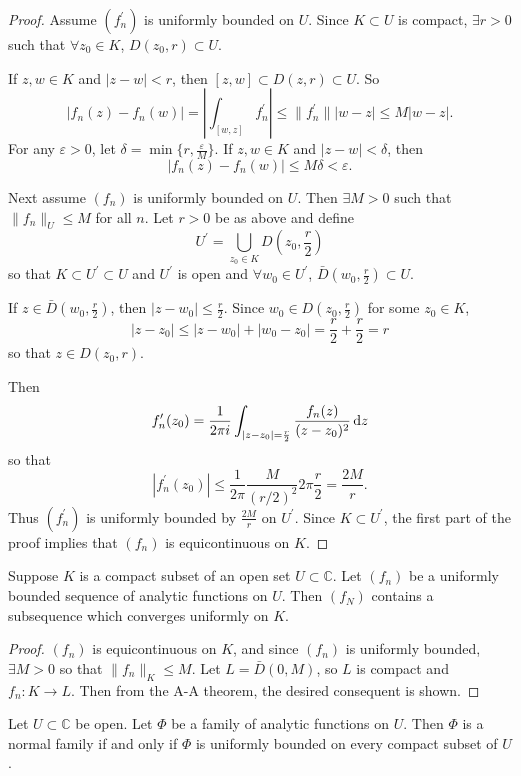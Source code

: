\begin{proof}
Assume $(f_n^\prime)$ is uniformly bounded on $U$. Since $K \subset U$
is compact, $\exists r > 0$ such that $\forall z_0 \in K$,
$D(z_0, r) \subset U$.

If $z, w \in K$ and $|z - w| < r$, then
$[z, w] \subset D(z, r) \subset U$. So
$$
  |f_n(z) - f_n(w)|
=    \left|
       \int_{[w, z]}
          f_n^\prime
     \right|
\leq \| f_n^\prime \| |w - z|
\leq M |w - z|.
$$
For any $\varepsilon > 0$, let
$\delta = \min \{ r, \frac{\varepsilon}{M} \}$. If
$z, w \in K$ and $|z - w| < \delta$, then
$$
     |f_n(z) - f_n(w)|
\leq M \delta
<    \varepsilon.
$$

Next assume $(f_n)$ is uniformly bounded on $U$. Then
$\exists M > 0$ such that $\| f_n \|_U \leq M$ for all $n$.
Let $r > 0$ be as above and define
$$
  U^\prime
= \bigcup_{z_0 \in K} D(z_0, \frac{r}{2})
$$
so that $K \subset U^\prime \subset U$ and $U^\prime$ is open
and $\forall w_0 \in U^\prime$,
$\bar{D}(w_0, \frac{r}{2}) \subset U$.

If $z \in \bar{D}(w_0, \frac{r}{2})$, then
$|z - w_0| \leq \frac{r}{2}$. Since
$w_0 \in D(z_0, \frac{r}{2})$ for some $z_0 \in K$,
$$
|z - z_0| \leq |z - w_0| + |w_0 - z_0| = \frac{r}{2} + \frac{r}{2} = r
$$
so that $z \in D(z_0, r)$.

Then
$$
  f_n^\prime(z_0)
= \frac{1}{2 \pi i}
  \int_{|z - z_0| = \frac{r}{2}}
    \frac{f_n(z)}
         {(z - z_0)^2}
    \mathop{}\!\mathrm{d} z
$$
so that
$$
     |f_n^\prime(z_0)|
\leq \frac{1}{2 \pi}
     \frac{M}{(r / 2)^2}
     2 \pi
     \frac{r}{2}
=    \frac{2M}{r}.
$$
Thus $(f_n^\prime)$ is uniformly bounded by $\frac{2M}{r}$ on
$U^\prime$. Since $K \subset U^\prime$, the first part of the proof
implies that $(f_n)$ is equicontinuous on $K$.
\end{proof}

\begin{corol}
Suppose $K$ is a compact subset of an open set $U \subset \mathbb{C}$.
Let $(f_n)$ be a uniformly bounded sequence of analytic functions on
$U$.
Then $(f_N)$ contains a subsequence which converges uniformly on $K$.
\end{corol}
\begin{proof}
$(f_n)$ is equicontinuous on $K$, and since $(f_n)$ is uniformly
bounded, $\exists M > 0$ so that $\| f_n \|_K \leq M$.
Let $L = \bar{D}(0, M)$, so $L$ is compact and $f_n : K \to L$. Then
from the A-A theorem, the desired consequent is shown.
\end{proof}

\begin{theorem}
Let $U \subset \mathbb{C}$ be open. Let $\Phi$ be a family of
analytic functions on $U$. Then $\Phi$ is a normal family if and only
if $\Phi$ is uniformly bounded on every compact subset of $U$.
\end{theorem}

